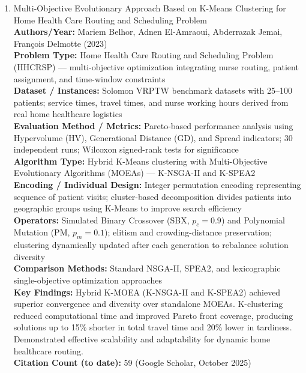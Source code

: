 \documentclass[a4paper,12pt]{article}
\begin{document}
\begin{enumerate}[leftmargin=2em, labelwidth=1em, labelsep=0.5em, itemsep=1ex]
  \item Multi-Objective Evolutionary Approach Based on K-Means Clustering for Home Health Care Routing and Scheduling Problem \\
    \textbf{Authors/Year:} Mariem Belhor, Adnen El-Amraoui, Abderrazak Jemai, François Delmotte (2023) \\  
    \textbf{Problem Type:} Home Health Care Routing and Scheduling Problem (HHCRSP) — multi-objective optimization integrating nurse routing, patient assignment, and time-window constraints \\  
    \textbf{Dataset / Instances:} Solomon VRPTW benchmark datasets with 25–100 patients; service times, travel times, and nurse working hours derived from real home healthcare logistics \\  
    \textbf{Evaluation Method / Metrics:} Pareto-based performance analysis using Hypervolume (HV), Generational Distance (GD), and Spread indicators; 30 independent runs; Wilcoxon signed-rank tests for significance \\  
    \textbf{Algorithm Type:} Hybrid K-Means clustering with Multi-Objective Evolutionary Algorithms (MOEAs) — K-NSGA-II and K-SPEA2 \\  
    \textbf{Encoding / Individual Design:} Integer permutation encoding representing sequence of patient visits; cluster-based decomposition divides patients into geographic groups using K-Means to improve search efficiency \\  
    \textbf{Operators:} Simulated Binary Crossover (SBX, $p_c=0.9$) and Polynomial Mutation (PM, $p_m=0.1$); elitism and crowding-distance preservation; clustering dynamically updated after each generation to rebalance solution diversity \\  
    \textbf{Comparison Methods:} Standard NSGA-II, SPEA2, and lexicographic single-objective optimization approaches \\  
    \textbf{Key Findings:} Hybrid K-MOEA (K-NSGA-II and K-SPEA2) achieved superior convergence and diversity over standalone MOEAs. K-clustering reduced computational time and improved Pareto front coverage, producing solutions up to 15\% shorter in total travel time and 20\% lower in tardiness. Demonstrated effective scalability and adaptability for dynamic home healthcare routing. \\  
    \textbf{Citation Count (to date):} 59 (Google Scholar, October 2025) \\[2ex]




\end{enumerate}
\end{document}
